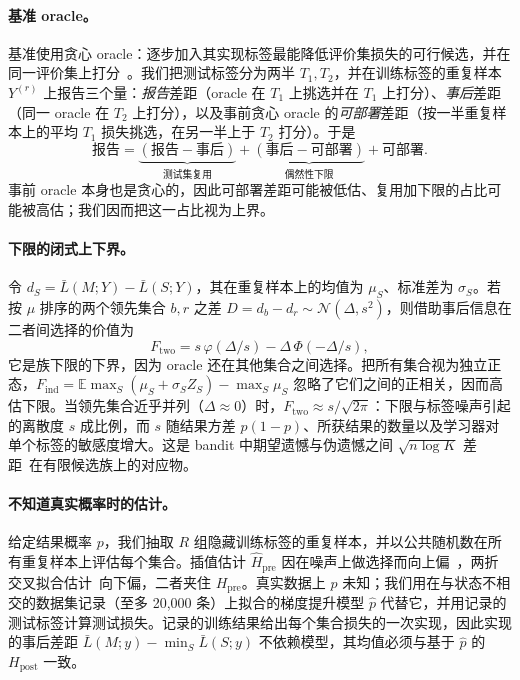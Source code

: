 \documentclass[runningheads]{llncs}
\begin{document}
\paragraph{基准 oracle。}基准使用贪心 oracle：逐步加入其实现标签最能降低评价集损失的可行候选，并在同一评价集上打分~\cite{werner2023comparable,werner2024cdalbench}。我们把测试标签分为两半 $T_1,T_2$，并在训练标签的重复样本 $Y^{(r)}$ 上报告三个量：\emph{报告}差距（oracle 在 $T_1$ 上挑选并在 $T_1$ 上打分）、\emph{事后}差距（同一 oracle 在 $T_2$ 上打分），以及事前贪心 oracle 的\emph{可部署}差距（按一半重复样本上的平均 $T_1$ 损失挑选，在另一半上于 $T_2$ 打分）。于是
\[
\text{报告}=\underbrace{(\text{报告}-\text{事后})}_{\text{测试集复用}}+\underbrace{(\text{事后}-\text{可部署})}_{\text{偶然性下限}}+\text{可部署}.
\]
事前 oracle 本身也是贪心的，因此可部署差距可能被低估、复用加下限的占比可能被高估；我们因而把这一占比视为上界。

\paragraph{下限的闭式上下界。}令 $d_S=\bar L(M;Y)-\bar L(S;Y)$，其在重复样本上的均值为 $\mu_S$、标准差为 $\sigma_S$。若按 $\mu$ 排序的两个领先集合 $b,r$ 之差 $D=d_b-d_r\sim\mathcal N(\Delta,s^2)$，则借助事后信息在二者间选择的价值为
\begin{equation}
 F_{\mathrm{two}}=s\,\varphi(\Delta/s)-\Delta\,\Phi(-\Delta/s),\label{eq:two}
\end{equation}
它是族下限的下界，因为 oracle 还在其他集合之间选择。把所有集合视为独立正态，$F_{\mathrm{ind}}=\mathbb E\max_S(\mu_S+\sigma_SZ_S)-\max_S\mu_S$ 忽略了它们之间的正相关，因而高估下限。当领先集合近乎并列（$\Delta\approx0$）时，$F_{\mathrm{two}}\approx s/\sqrt{2\pi}$：下限与标签噪声引起的离散度 $s$ 成比例，而 $s$ 随结果方差 $p(1-p)$、所获结果的数量以及学习器对单个标签的敏感度增大。这是 bandit 中期望遗憾与伪遗憾之间 $\sqrt{n\log K}$ 差距~\cite{audibert2010regret}在有限候选族上的对应物。

\paragraph{不知道真实概率时的估计。}给定结果概率 $p$，我们抽取 $R$ 组隐藏训练标签的重复样本，并以公共随机数在所有重复样本上评估每个集合。插值估计 $\widehat H_{\mathrm{pre}}$ 因在噪声上做选择而向上偏~\cite{smith2006optimizer,cawley2010overfitting}，两折交叉拟合估计~\cite{chernozhukov2018double}向下偏，二者夹住 $H_{\mathrm{pre}}$。真实数据上 $p$ 未知；我们用在与状态不相交的数据集记录（至多 20{,}000 条）上拟合的梯度提升模型 $\hat p$ 代替它，并用记录的测试标签计算测试损失。记录的训练结果给出每个集合损失的一次实现，因此实现的事后差距 $\bar L(M;y)-\min_S\bar L(S;y)$ 不依赖模型，其均值必须与基于 $\hat p$ 的 $H_{\mathrm{post}}$ 一致。
\end{document}
